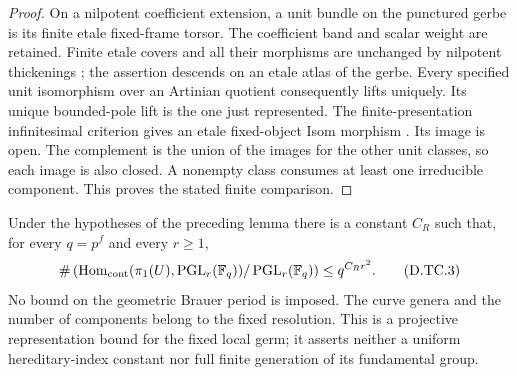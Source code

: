 \begin{proof}
On a nilpotent coefficient extension,
a unit bundle on the punctured gerbe
is its finite etale fixed-frame torsor.
The coefficient band and scalar weight
are retained. Finite etale covers and
all their morphisms are unchanged by
nilpotent thickenings
\citep[Lemma58.8.3, complete proof, Tag0BQB]
{StacksUnitJetTransferD}; the assertion
descends on an etale atlas of the gerbe.
Every specified unit isomorphism over
an Artinian quotient consequently lifts
uniquely. Its unique bounded-pole lift
is the one just represented. The
finite-presentation infinitesimal
criterion gives an etale fixed-object
Isom morphism
\citep[Tags02HT,02HM and00UR]{StacksUnitJetTransferD}.
Its image is open. The complement is
the union of the images for the other
unit classes, so each image is also
closed. A nonempty class consumes at
least one irreducible component. This
proves the stated finite comparison.
\end{proof}

\begin{theorem}
\label{D:SNC-tree-projective-quadratic-count}
Under the hypotheses of the preceding lemma there
is a constant $C_R$ such that, for every $q=p^f$
and every $r\geq1$,
\[
 \#\left(\operatorname{Hom}_{\rm cont}
       (\pi_1(U),\operatorname{PGL}_r(\mathbb F_q))
                    /\operatorname{PGL}_r(\mathbb F_q)\right)
                         \leq q^{C_Rr^2}.              \tag{D.TC.3}
\]
No bound on the geometric Brauer period is imposed.
The curve genera and the number of components belong
to the fixed resolution. This is a projective
representation bound for the fixed local germ;
it asserts neither a uniform hereditary-index
constant nor full finite generation of its
fundamental group.
\end{theorem}

